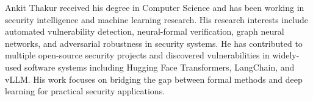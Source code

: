 \documentclass[10pt,journal,compsoc]{IEEEtran}
\begin{document}
\begin{IEEEbiography}{Ankit Thakur}
received his degree in Computer Science and has been working in security intelligence and machine learning research. His research interests include automated vulnerability detection, neural-formal verification, graph neural networks, and adversarial robustness in security systems. He has contributed to multiple open-source security projects and discovered vulnerabilities in widely-used software systems including Hugging Face Transformers, LangChain, and vLLM. His work focuses on bridging the gap between formal methods and deep learning for practical security applications.
\end{IEEEbiography}

\vfill
\end{document}
